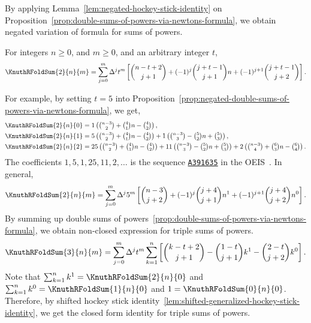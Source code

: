 By applying Lemma~\eqref{lem:negated-hockey-stick-identity}
on Proposition~\eqref{prop:double-sums-of-powers-via-newtons-formula},
we obtain negated variation of formula for sums of powers.

\begin{proposition}
  \label{prop:negated-double-sums-of-powers-via-newtons-formula}
  For integers $n\geq 0$, and $m\geq 0$, and an arbitrary integer $t$,
  \begin{align*}
    \KnuthRFoldSum{2}{n}{m}
    = \sum_{j=0}^{m} \Delta^{j} t^m
    \left[
      \binom{n-t+2}{j+1} + (-1)^j \binom{j+t-1}{j+1} n
      + (-1)^{j+1} \binom{j+t-1}{j+2}
    \right].
  \end{align*}
\end{proposition}

For example, by setting $t=5$ into
Proposition~\eqref{prop:negated-double-sums-of-powers-via-newtons-formula},
we get,
\begin{align*}
  \KnuthRFoldSum{2}{n}{0}
  &= 1 \left( \tbinom{n-3}{2} + \tbinom{4}{1} n - \tbinom{4}{2} \right),
  \\
  \KnuthRFoldSum{2}{n}{1}
  &= 5 \left( \tbinom{n-3}{2} + \tbinom{4}{1} n - \tbinom{4}{2} \right)
  + 1 \left( \tbinom{n-3}{3} - \tbinom{5}{2} n + \tbinom{5}{3} \right),
  \\
  \KnuthRFoldSum{2}{n}{2}
  &= 25 \left( \tbinom{n-3}{2} + \tbinom{4}{1} n - \tbinom{4}{2} \right)
  + 11 \left( \tbinom{n-3}{3} - \tbinom{5}{2} n + \tbinom{5}{3} \right)
  + 2 \left( \tbinom{n-3}{4} + \tbinom{6}{3} n - \tbinom{6}{4} \right).
\end{align*}
The coefficients $1,5,1,25,11,2,\dots$ is the sequence
\href{https://oeis.org/A391635}{\texttt{A391635}}
in the OEIS~\cite{sloane2003line}.
In general,
\begin{align*}
  \KnuthRFoldSum{2}{n}{m}
  = \sum_{j=0}^{m} \Delta^{j} 5^{m}
  \left[
    \binom{n-3}{j+2} + (-1)^{j} \binom{j+4}{j+1} n^1
    + (-1)^{j+1} \binom{j+4}{j+2} n^0
  \right].
\end{align*}
By summing up double sums of
powers~\eqref{prop:double-sums-of-powers-via-newtons-formula},
we obtain non-closed expression for triple sums of powers.
\begin{align*}
  \KnuthRFoldSum{3}{n}{m}
  = \sum_{j=0}^{m} \Delta^{j} t^m \sum_{k=1}^{n}
  \left[
    \binom{k-t+2}{j+1} - \binom{1-t}{j+1} k^1 - \binom{2-t}{j+2} k^0
  \right].
\end{align*}
Note that $\sum_{k=1}^{n} k^1
= \KnuthRFoldSum{2}{n}{0} $ and $\sum_{k=1}^{n} k^0 = \KnuthRFoldSum{1}{n}{0}$
and $1 = \KnuthRFoldSum{0}{n}{0}$.
Therefore, by shifted hockey stick
identity~\eqref{lem:shifted-generalized-hockey-stick-identity}, we get
the closed form identity for triple sums of powers.

